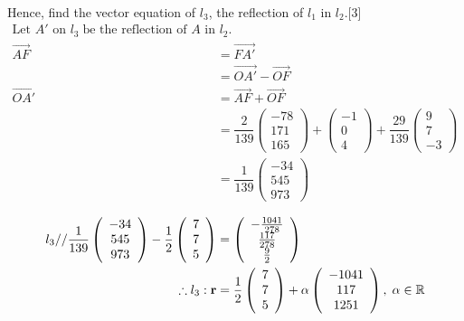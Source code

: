\documentclass[12pt, a4 paper]{article}
\begin{document}
\begin{outline}[enumerate]
\begin{align*}
					\end{align*}
					\color{black}
					\2 Hence, find the vector equation of ${l_3}$, the reflection of ${l_1}$ in ${l_2}$.\hfill[3]
					\color{blue}
					\begin{align*}
						{\textrm{Let }}A'{\textrm{ on }}{l_3}\;{\textrm{be the reflection of }}A{\textrm{ in }}{l_2}. \\\overrightarrow {AF}  &= \overrightarrow {FA'} \\ &= \overrightarrow {OA'}  - \overrightarrow {OF}\\\overrightarrow {OA'}  &= \overrightarrow {AF}  + \overrightarrow {OF} \\ &= \dfrac{2}{{139}}\left( {\begin{array}{*{20}{c}}{ - 78}\\{171}\\{165}\end{array}} \right) + \left( {\begin{array}{*{20}{c}}{ - 1}\\0\\4\end{array}} \right) + \dfrac{{29}}{{139}}\left( {\begin{array}{*{20}{c}}9\\7\\{ - 3}\end{array}} \right)\\ &= \dfrac{1}{{139}}\left( {\begin{array}{*{20}{c}}{ - 34}\\{545}\\{973}\end{array}} \right) \\\end{align*}\begin{align*}{l_3}{\textrm{//}}\dfrac{1}{{139}}\left( {\begin{array}{*{20}{c}}{ - 34}\\{545}\\{973}\end{array}} \right) - \dfrac{1}{2}\left( {\begin{array}{*{20}{c}}7\\7\\5\end{array}} \right) &= \left( {\begin{array}{*{20}{c}}{ - \frac{{1041}}{{278}}}\\{\frac{{117}}{{278}}}\\{\frac{9}{2}}\end{array}} \right)\\\therefore {l_3}:{\bf{r}} &= \dfrac{1}{2}\left( {\begin{array}{*{20}{c}}7\\7\\5\end{array}} \right) + \alpha \left( {\begin{array}{*{20}{c}}{ - 1041}\\{117}\\{1251}\end{array}} \right),\;\alpha  \in \mathbb{R}
					\end{align*}


\end{outline}
\end{document}
